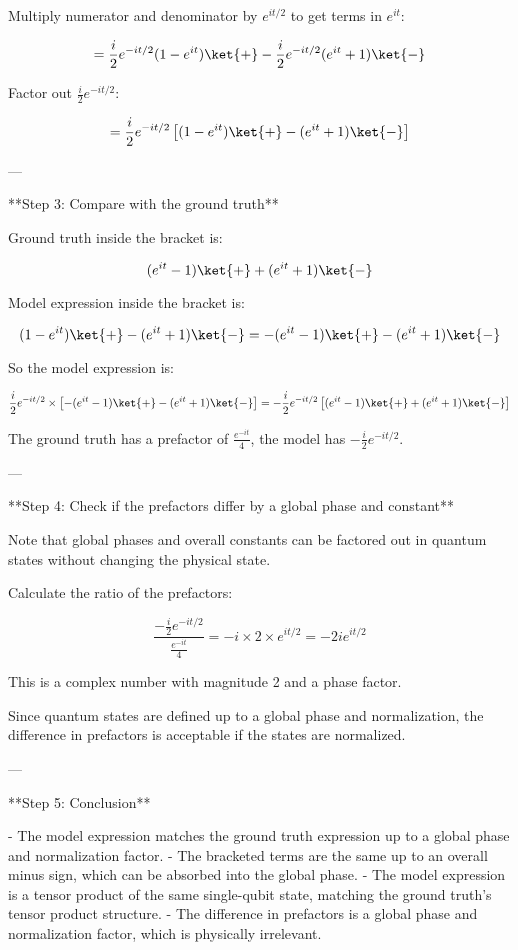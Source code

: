 \documentclass[10pt]{article}
\begin{document}
Multiply numerator and denominator by \(e^{i t/2}\) to get terms in \(e^{i t}\):

\[
= \frac{i}{2} e^{-i t/2} (1 - e^{i t}) \ket{+} - \frac{i}{2} e^{-i t/2} (e^{i t} + 1) \ket{-}
\]

Factor out \(\frac{i}{2} e^{-i t/2}\):

\[
= \frac{i}{2} e^{-i t/2} \left[ (1 - e^{i t}) \ket{+} - (e^{i t} + 1) \ket{-} \right]
\]

---

**Step 3: Compare with the ground truth**

Ground truth inside the bracket is:

\[
(e^{i t} - 1) \ket{+} + (e^{i t} + 1) \ket{-}
\]

Model expression inside the bracket is:

\[
(1 - e^{i t}) \ket{+} - (e^{i t} + 1) \ket{-} = - (e^{i t} - 1) \ket{+} - (e^{i t} + 1) \ket{-}
\]

So the model expression is:

\[
\frac{i}{2} e^{-i t/2} \times \left[ - (e^{i t} - 1) \ket{+} - (e^{i t} + 1) \ket{-} \right] = - \frac{i}{2} e^{-i t/2} \left[ (e^{i t} - 1) \ket{+} + (e^{i t} + 1) \ket{-} \right]
\]

The ground truth has a prefactor of \(\frac{e^{-i t}}{4}\), the model has \(- \frac{i}{2} e^{-i t/2}\).

---

**Step 4: Check if the prefactors differ by a global phase and constant**

Note that global phases and overall constants can be factored out in quantum states without changing the physical state.

Calculate the ratio of the prefactors:

\[
\frac{- \frac{i}{2} e^{-i t/2}}{\frac{e^{-i t}}{4}} = -i \times 2 \times e^{i t/2} = -2 i e^{i t/2}
\]

This is a complex number with magnitude 2 and a phase factor.

Since quantum states are defined up to a global phase and normalization, the difference in prefactors is acceptable if the states are normalized.

---

**Step 5: Conclusion**

- The model expression matches the ground truth expression up to a global phase and normalization factor.
- The bracketed terms are the same up to an overall minus sign, which can be absorbed into the global phase.
- The model expression is a tensor product of the same single-qubit state, matching the ground truth's tensor product structure.
- The difference in prefactors is a global phase and normalization factor, which is physically irrelevant.
\end{document}

